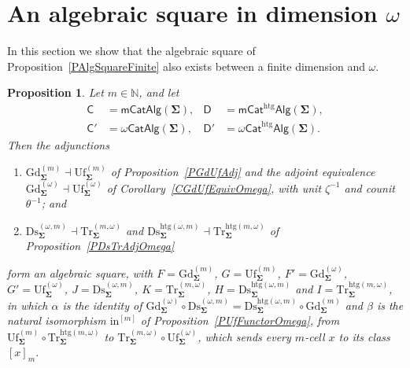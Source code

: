 \documentclass[a4paper, reqno]{amsbook}
\newcommand{\sig}[1]{\mathbf{#1}}             %
\newcommand{\htg}{\mathrm{htg}}                %
\newcommand{\Gd}{\mathrm{Gd}}
\newcommand{\Uf}{\mathrm{Uf}}
\newcommand{\Ds}{\mathrm{Ds}}
\newcommand{\Tr}{\mathrm{Tr}}
\theoremstyle{plain}
\newtheorem{proposition}[theorem]{Proposition}
\theoremstyle{definition}
\begin{document}
\section{An algebraic square in dimension \texorpdfstring{$\omega$}{omega}}\label{SAlgSquareOmega}

In this section we show that the algebraic square of Proposition~\ref{PAlgSquareFinite} also exists between a finite dimension and $\omega$.

\begin{proposition}\label{PAlgSquareOmega}
Let $m\in\mathbb{N}$, and let
$$
\begin{aligned}
\mathsf{C}&=\mathsf{mCatAlg}(\sig{\Sigma}), &
\mathsf{D}&=\mathsf{mCat}^{\htg}\mathsf{Alg}(\sig{\Sigma}),\\
\mathsf{C}'&=\omega\mathsf{CatAlg}(\sig{\Sigma}), &
\mathsf{D}'&=\omega\mathsf{Cat}^{\htg}\mathsf{Alg}(\sig{\Sigma}).
\end{aligned}
$$
Then the adjunctions
\begin{enumerate}
\item $\Gd^{(m)}_{\sig{\Sigma}}\dashv\Uf^{(m)}_{\sig{\Sigma}}$ of Proposition~\ref{PGdUfAdj} and the adjoint equivalence $\Gd^{(\omega)}_{\sig{\Sigma}}\dashv\Uf^{(\omega)}_{\sig{\Sigma}}$ of Corollary~\ref{CGdUfEquivOmega}, with unit $\zeta^{-1}$ and counit $\theta^{-1}$; and
\item $\Ds^{(\omega,m)}_{\sig{\Sigma}}\dashv \Tr^{(m,\omega)}_{\sig{\Sigma}}$ and $\Ds^{\htg(\omega,m)}_{\sig{\Sigma}}\dashv \Tr^{\htg(m,\omega)}_{\sig{\Sigma}}$ of Proposition~\ref{PDsTrAdjOmega}
\end{enumerate}
form an algebraic square, with $F=\Gd^{(m)}_{\sig{\Sigma}}$, $G=\Uf^{(m)}_{\sig{\Sigma}}$, $F'=\Gd^{(\omega)}_{\sig{\Sigma}}$, $G'=\Uf^{(\omega)}_{\sig{\Sigma}}$, $J=\Ds^{(\omega,m)}_{\sig{\Sigma}}$, $K=\Tr^{(m,\omega)}_{\sig{\Sigma}}$, $H=\Ds^{\htg(\omega,m)}_{\sig{\Sigma}}$ and $I=\Tr^{\htg(m,\omega)}_{\sig{\Sigma}}$, in which $\alpha$ is the identity of $\Gd^{(\omega)}_{\sig{\Sigma}}\circ\Ds^{(\omega,m)}_{\sig{\Sigma}}=\Ds^{\htg(\omega,m)}_{\sig{\Sigma}}\circ\Gd^{(m)}_{\sig{\Sigma}}$ and $\beta$ is the natural isomorphism $\mathrm{in}^{[m]}$ of Proposition~\ref{PUfFunctorOmega}, from $\Uf^{(m)}_{\sig{\Sigma}}\circ \Tr^{\htg(m,\omega)}_{\sig{\Sigma}}$ to $\Tr^{(m,\omega)}_{\sig{\Sigma}}\circ\Uf^{(\omega)}_{\sig{\Sigma}}$, which sends every $m$-cell $x$ to its class $[x]_{m}$.
\end{proposition}
\end{document}
